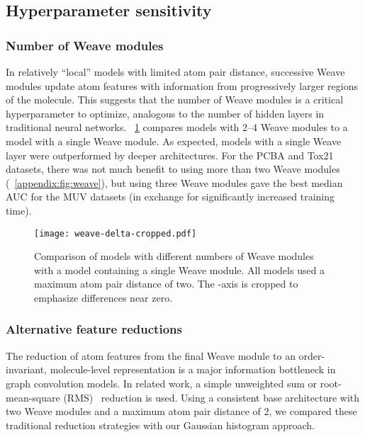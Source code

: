 \subsection{Hyperparameter sensitivity}
\label{sec:hyperparameter_sensitivity}

\subsubsection{Number of Weave modules}

In relatively ``local'' models with limited atom pair distance, successive Weave
modules update atom features with information from progressively larger regions
of the molecule. This suggests that the number of Weave modules is a critical
hyperparameter to optimize, analogous to the number of hidden layers in
traditional neural networks. \figurename~\ref{fig:weave_delta} compares models
with 2--4 Weave modules to a model with a single Weave module. As expected,
models with a single Weave layer were outperformed by deeper architectures.
For the PCBA and Tox21 datasets, there was not much benefit to using more than
two Weave modules (\figurename~\ref{appendix:fig:weave}), but using
three Weave modules gave the best median AUC for the MUV datasets (in exchange
for significantly increased training time).

\begin{figure}[tb]
\centering
  \texttt{[image: weave-delta-cropped.pdf]}
  \caption{
    Comparison of models with different numbers of Weave modules with a model
    containing a single Weave module. All models used a maximum atom pair
    distance of two. The -axis is cropped to emphasize differences near zero.
  }
  \label{fig:weave_delta}
\end{figure}

\subsubsection{Alternative feature reductions}

The reduction of atom features from the final Weave module to an
order-invariant, molecule-level representation is a major information bottleneck
in graph convolution models. In related work, a simple unweighted sum
\citep{duvenaud2015convolutional, merkwirth2005automatic,
lusci2013deep} or root-mean-square (RMS)~\citep{dieleman2015classifying}
reduction is used. Using a consistent base architecture with two Weave modules
and a maximum atom pair distance of 2, we
compared these traditional reduction strategies with our Gaussian histogram approach.

